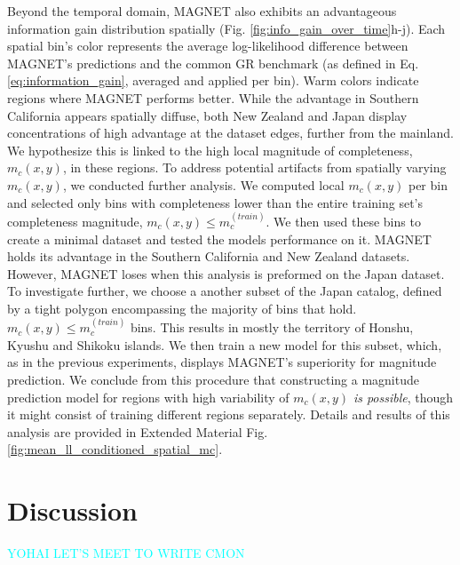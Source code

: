 \documentclass[pdflatex]{sn-jnl}
\newcommand{\neri}[1]{{\textcolor{cyan}{#1}}}
\begin{document}
Beyond the temporal domain, MAGNET also exhibits an advantageous information gain distribution spatially (Fig. \ref{fig:info_gain_over_time}h-j). Each spatial bin's color represents the average log-likelihood difference between MAGNET's predictions and the common GR benchmark (as defined in Eq. \ref{eq:information_gain}, averaged and applied per bin). Warm colors indicate regions where MAGNET performs better. While the advantage in Southern California appears spatially diffuse, both New Zealand and Japan display concentrations of high advantage at the dataset edges, further from the mainland. We hypothesize this is linked to the high local magnitude of completeness, $m_c(x,y)$, in these regions. To address potential artifacts from spatially varying $m_c(x,y)$, we conducted further analysis. We computed local $m_c(x,y)$ per bin and selected only bins with completeness lower than the entire training set's completeness magnitude, $m_c \left( x,y \right)  \leq m_c^{ \left( train \right) }$. We then used these bins to create a minimal dataset and tested the models performance on it. MAGNET holds its advantage in the Southern California and New Zealand datasets. However, MAGNET loses when this analysis is preformed on the Japan dataset. To investigate further, we choose a another subset of the Japan catalog, defined by a tight polygon encompassing the majority of bins that hold. $m_c \left( x,y \right)  \leq m_c^{ \left( train \right) }$ bins. This results in mostly the territory of Honshu, Kyushu and Shikoku islands. We then train a new model for this subset, which, as in the previous experiments, displays MAGNET's superiority for magnitude prediction. We conclude from this procedure that constructing a magnitude prediction model for regions with high variability of $m_c(x,y)$ \textit{is possible}, though it might consist of training different regions separately. Details and results of this analysis are provided in Extended Material Fig. \ref{fig:mean_ll_conditioned_spatial_mc}.


\section{Discussion}
\neri{YOHAI LET'S MEET TO WRITE CMON}


\let\oldbibliography\thebibliography
\renewcommand{\thebibliography}[1]{%
  \oldbibliography{#1}%
  \setlength{\itemsep}{10pt}%
}
% 
% 
\newpage

\end{document}
